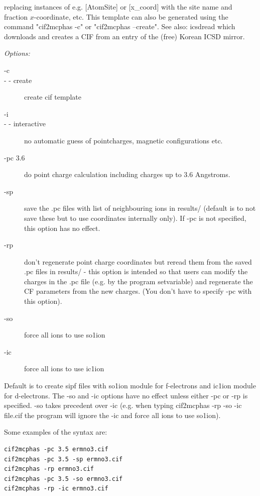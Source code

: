 \begin{description}
replacing instances of e.g. [AtomSite] or [x\_coord] with the site name and fraction $x$-coordinate, etc.
This template can also be generated using the command "{\prg cif2mcphas -c}" or "{\prg cif2mcphas --create}".
See also: {\prg icsdread} which downloads and creates a CIF from an entry of the (free) Korean ICSD mirror.

{\em Options:}
\begin{description}
\item[-c]
\item[- - create]  create cif template
\item[-i]
\item[- - interactive] no automatic guess of pointcharges, magnetic configurations etc. 
\item[-pc 3.6] do point charge calculation including charges up to 3.6 Angstroms.

\item[-sp       ] save the .pc files with list of neighbouring ions in results/ (default is to not save these but to use coordinates internally only). If -pc is not specified, this option has no effect.

\item[-rp        ] don't regenerate point charge coordinates but reread them from 
the saved .pc files in results/ - this option is intended so that users can 
modify the charges in the .pc file (e.g. by the program {\prg setvariable})
 and regenerate the CF parameters 
from the new charges. (You don't have to specify -pc with this option).

\item[-so       ]  force all ions to use so1ion
\item[-ic        ] force all ions to use ic1ion
\end{description}

Default is to create sipf files with so1ion module for f-electrons and ic1ion module for d-electrons.
 The {\prg -so} and {\prg -ic} options have no effect unless either {\prg -pc}
 or {\prg -rp} is specified.
{\prg -so} takes precedent over {\prg -ic} (e.g. 
when typing {\prg cif2mcphas -rp -so -ic file.cif} the program will ignore the
{\prg -ic} and force all ions to use so1ion).

Some examples of the syntax are:
\begin{verbatim}
cif2mcphas -pc 3.5 ermno3.cif
cif2mcphas -pc 3.5 -sp ermno3.cif
cif2mcphas -rp ermno3.cif
cif2mcphas -pc 3.5 -so ermno3.cif
cif2mcphas -rp -ic ermno3.cif
\end{verbatim}


\end{description}

